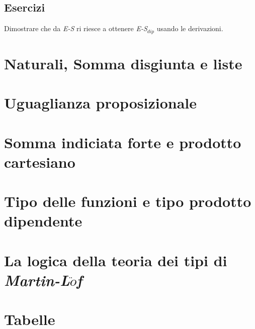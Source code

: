 \documentclass[10pt,a4paper, italian]{book}
\begin{document}
\section{Esercizi}
\label{sec:esercizi-cap2}
Dimostrare che da \textit{E-S} ri riesce a ottenere \textit{E-S$_{dip}$} usando le derivazioni.


































\chapter{Naturali, Somma disgiunta e liste}

\chapter{Uguaglianza proposizionale}

\chapter{Somma indiciata forte e prodotto cartesiano}

\chapter{Tipo delle funzioni e tipo prodotto dipendente}

\chapter{La logica della teoria dei tipi di \textit{Martin-L$\ddot{o}$f}}

\appendix
\chapter{Tabelle}
\end{document}
